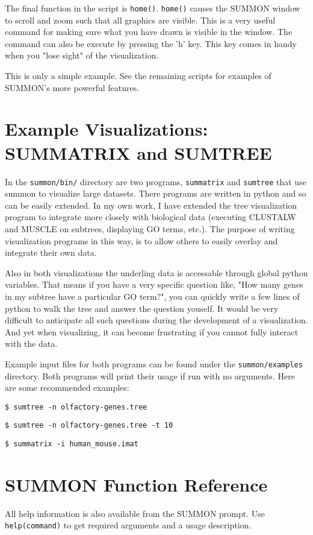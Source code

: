 \documentclass[12pt]{article}
\newcommand{\code}[1]{{\tt #1}}
\newcommand{\codeblock}[1]{\vspace{.1in} {\tt #1} \vspace{.1in}}
\begin{document}
The final function in the script is \code{home()}.  \code{home()} causes the
SUMMON window to scroll and zoom such that all graphics are visible.  This is a
very useful command for making sure what you have drawn is visible in the
window.  The command can also be execute by pressing the 'h' key.  This key 
comes in handy when you "lose sight" of the visualization.

This is only a simple example.  See the remaining scripts for examples of
SUMMON's more powerful features.

\section{Example Visualizations: SUMMATRIX and SUMTREE}

In the \code{summon/bin/} directory are two programs, \code{summatrix} and
\code{sumtree} that use summon to visualize large datasets.  There programs are
written in python and so can be easily extended.  In my own work, I have 
extended the tree visualization program to integrate more closely with biological
data (executing CLUSTALW and MUSCLE on subtrees, displaying GO terms, etc.).  The
purpose of writing visualization programs in this way, is to allow others to
easily overlay and integrate their own data.  

Also in both visualizations the underling data is accessable through global python
variables.  That means if you have a very specific question like, "How many
genes in my subtree have a particular GO term?", you can quickly write a few
lines of python to walk the tree and answer the question youself.  It would be
very difficult to anticipate all such questions during the development of a
visualization.  And yet when visualizing, it can become frustrating if you cannot
fully interact with the  data.

Example input files for both programs can be found under the 
\code{summon/examples} directory.  Both programs will print their usage if run
with no arguments.  Here are some recommended examples:

\codeblock{\$ sumtree -n olfactory-genes.tree}

\codeblock{\$ sumtree -n olfactory-genes.tree -t 10}

\codeblock{\$ summatrix -i human\_mouse.imat}


\section{SUMMON Function Reference}

All help information is also available from the SUMMON prompt.  Use 
\code{help(command)} to get required arguments and a usage description.


\end{document}

